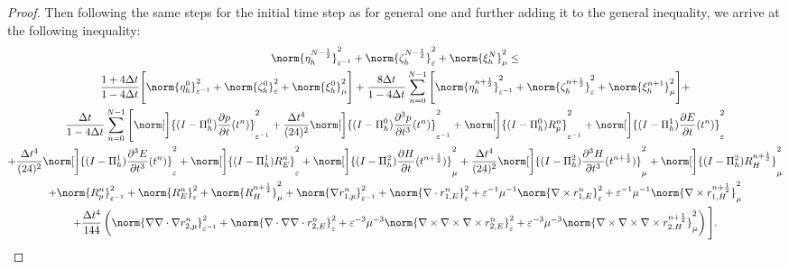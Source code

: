 \documentclass{amsart}
\theoremstyle{thmstyleone}%
\theoremstyle{thmstyletwo}%
\theoremstyle{thmstylethree}%
\begin{document}
\begin{proof}
Then following the same steps for the initial time step as for general one and further adding it to the general inequality, we arrive at the following inequality:
\begin{multline*}
  \norm{\eta_h^{N - \frac{1}{2}}}^2_{\varepsilon^{-1}} + \norm{\zeta_h^{N - \frac{1}{2}}}^2_{\varepsilon} + \norm{\xi_h^N}^2_{\mu} \le \\
  \dfrac{1 + 4 \Delta t}{1 - 4 \Delta t} \Bigg[ \norm{\eta_h^0}^2_{\varepsilon^{-1}} + \norm{\zeta_h^0}^2_{\varepsilon} + \norm{\xi_h^0}^2_{\mu} \Bigg] + \dfrac{8 \Delta t}{1 - 4\Delta t} \sum\limits_{n = 0}^{N - 1} \Bigg[ \norm{\eta_h^{n + \frac{1}{2}}}^2_{\varepsilon^{-1}} + \norm{\zeta_h^{n + \frac{1}{2}}}^2_{\varepsilon} +  \norm{\xi_h^{n + 1}}^2_{\mu} \Bigg] + \\
  \dfrac{ \Delta t}{1 - 4 \Delta t} \sum\limits_{n = 0}^{N - 1} \Bigg[ \norm[\bigg]{(I - \Pi_h^0) \dfrac{\partial p}{\partial t}(t^n)}^2_{\varepsilon^{-1}} + \dfrac{\Delta t^4}{(24)^2} \norm[\bigg]{(I - \Pi_h^0) \dfrac{\partial^3 p}{\partial t^3}(t^n)}^2_{\varepsilon^{-1}} + \norm[\bigg]{(I - \Pi_h^0) R_p^n}^2_{\varepsilon^{-1}} + \norm[\bigg]{(I - \Pi_h^1) \dfrac{\partial E}{\partial t}(t^n)}^2_{\varepsilon} \\ + \dfrac{\Delta t^4}{(24)^2} \norm[\bigg]{(I - \Pi_h^1) \dfrac{\partial^3 E}{\partial t^3}(t^n)}^2_{\varepsilon} + \norm[\bigg]{(I - \Pi_h^1) R_E^n}^2_{\varepsilon} + \norm[\bigg]{(I - \Pi_h^2) \dfrac{\partial H}{\partial t}(t^{n + \frac{1}{2}})}^2_\mu  + \dfrac{\Delta t^4}{(24)^2} \norm[\bigg]{(I - \Pi_h^2) \dfrac{\partial^3 H}{\partial t^3}(t^{n + \frac{1}{2}})}^2_{\mu} + \norm[\bigg]{(I - \Pi_h^2) R_H^{n + \frac{1}{2}}}^2_{\mu} \\ + \norm{R_p^n}^2_{\varepsilon^{-1}} + \norm{R_E^n}^2_{\varepsilon} + \norm{R_H^{n + \frac{1}{2}}}^2_{\mu} + \norm{\nabla r_{1,p}^n} ^2_{\varepsilon^{-1}} + \norm{\nabla \cdot r_{1,E}^n}^2_{\varepsilon} + \varepsilon^{-1} \mu^{-1} \norm{\nabla \times r_{1,E}^n}^2_{\varepsilon} +  \varepsilon^{-1} \mu^{-1} \norm{\nabla \times r_{1,H}^{n + \frac{1}{2}}}^2_{\mu}  \\
+  \dfrac{\Delta t^4}{144} \left( \norm{\nabla \nabla \cdot \nabla r_{2,p}^n} ^2_{\varepsilon^{-1}} + \norm{\nabla \cdot \nabla \nabla \cdot r_{2,E}^n}^2_{\varepsilon} + \varepsilon^{-3} \mu^{-3} \norm{\nabla \times \nabla \times \nabla \times r_{2,E}^n}^2_{\varepsilon} +  \varepsilon^{-3} \mu^{-3} \norm{\nabla \times \nabla \times \nabla \times r_{2,H}^{n + \frac{1}{2}}}^2_{\mu} \right)  \Bigg].
\end{multline*}


\end{proof}
\end{document}
